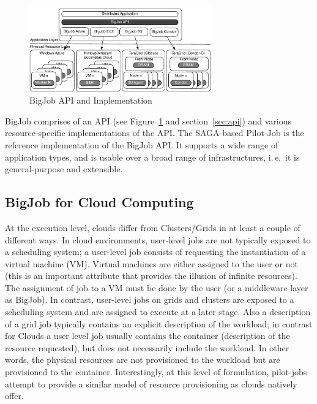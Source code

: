 \documentclass[]{article}
\begin{document}
\begin{figure}[t]
    \centering
        \includegraphics[width=0.7\textwidth]{figures/distributed_pilot_job.pdf}
    \caption{BigJob API and Implementation}
    \label{fig:figures_distributed_pilot_job}
\end{figure}

BigJob comprises of an API (see Figure~\ref{fig:figures_distributed_pilot_job}
and section~\ref{sec:api}) and various resource-specific implementations of the
API. The SAGA-based Pilot-Job is the reference implementation of the BigJob API.
It supports a wide range of application types, and is usable over a broad range
of infrastructures, i.\,e.\ it is general-purpose and extensible.


\subsection{BigJob for Cloud Computing}

At the execution level, clouds differ from Clusters/Grids in at least a couple
of different ways. In cloud environments, user-level jobs are not typically
exposed to a scheduling system; a user-level job consists of requesting the
instantiation of a virtual machine (VM). Virtual machines are either assigned to
the user or not (this is an important attribute that provides the illusion of
infinite resources). The assignment of job to a VM must be done by the user (or
a middleware layer as BigJob). In contrast, user-level jobs on grids and 
clusters are exposed to a scheduling system and are
assigned to execute at a later stage. Also a description of a grid job typically
contains an explicit description of the workload; in contrast for Clouds a user
level job usually contains the container (description of the resource
requested), but does not necessarily include the workload. In other words, the
physical resources are not provisioned to the workload but are provisioned to
the container.  Interestingly, at this level of formulation, pilot-jobs attempt 
to provide a similar model of resource provisioning as clouds natively offer. 
\end{document}

